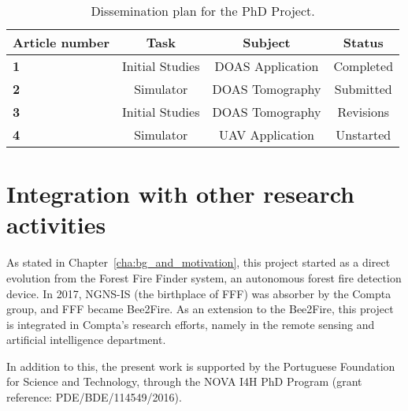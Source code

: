 \begin{table}[htpb]
    \centering
    \small
    \caption{Dissemination plan for the PhD Project.}
    \label{tab:dissemination_plan}
    \begin{tabularx}{0.8\textwidth}{Xccc}
        \toprule
        \textbf{Article number} & \textbf{Task} & \textbf{Subject} &
        \textbf{Status}\\ 
        \midrule
        \textbf{1} & Initial Studies & DOAS Application & Completed\\
        \midrule
        \textbf{2} & Simulator & DOAS Tomography & Submitted\\
        \midrule
        \textbf{3} & Initial Studies & DOAS Tomography & Revisions\\
        \midrule
        \textbf{4} & Simulator & UAV Application & Unstarted\\ 
        \bottomrule
    \end{tabularx}
\end{table}

\section{Integration with other research activities}%
\label{sec:integration_with_other_research_activities}

As stated in Chapter~\ref{cha:bg_and_motivation}, this project started
as a direct evolution from the Forest Fire Finder system, an autonomous
forest fire detection device. In 2017, NGNS-IS (the birthplace of
\gls{FFF}) was absorber by the Compta group, and \gls{FFF} became
Bee2Fire. As an extension to the Bee2Fire, this project is integrated in
Compta's research efforts, namely in the remote sensing and artificial
intelligence department. 

In addition to this, the present work is supported by the Portuguese
Foundation for Science and Technology, through the NOVA I4H PhD Program
(grant reference: PDE/BDE/114549/2016).






